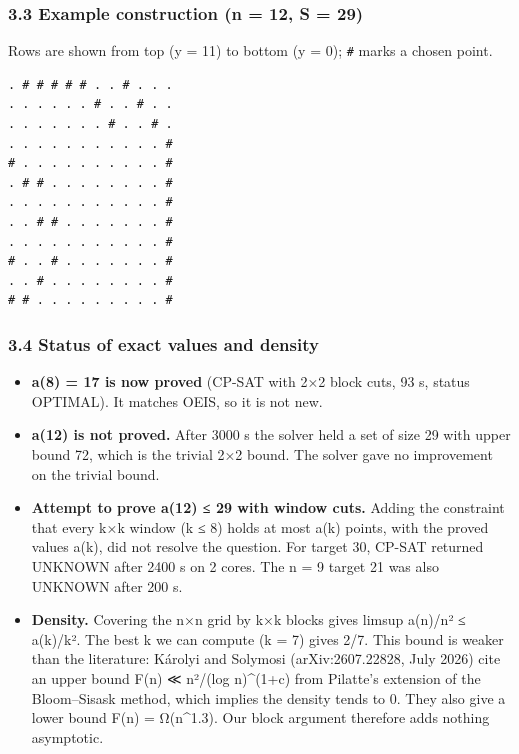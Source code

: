 \documentclass[
  11pt,
]{article}
\providecommand{\tightlist}{%
  \setlength{\itemsep}{0pt}\setlength{\parskip}{0pt}}
\begin{document}
\subsubsection{3.3 Example construction (n = 12, \textbar S\textbar{} =
29)}\label{example-construction-n-12-s-29}

Rows are shown from top (y = 11) to bottom (y = 0); \texttt{\#} marks a
chosen point.

\begin{verbatim}
. # # # # # . . # . . .
. . . . . . # . . # . .
. . . . . . . # . . # .
. . . . . . . . . . . #
# . . . . . . . . . . #
. # # . . . . . . . . #
. . . . . . . . . . . #
. . # # . . . . . . . #
. . . . . . . . . . . #
# . . # . . . . . . . #
. . # . . . . . . . . #
# # . . . . . . . . . #
\end{verbatim}

\subsubsection{3.4 Status of exact values and
density}\label{status-of-exact-values-and-density}

\begin{itemize}
\tightlist
\item
  \textbf{a(8) = 17 is now proved} (CP-SAT with 2×2 block cuts, 93 s,
  status OPTIMAL). It matches OEIS, so it is not new.
\item
  \textbf{a(12) is not proved.} After 3000 s the solver held a set of
  size 29 with upper bound 72, which is the trivial 2×2 bound. The
  solver gave no improvement on the trivial bound.
\item
  \textbf{Attempt to prove a(12) ≤ 29 with window cuts.} Adding the
  constraint that every k×k window (k ≤ 8) holds at most a(k) points,
  with the proved values a(k), did not resolve the question. For target
  30, CP-SAT returned UNKNOWN after 2400 s on 2 cores. The n = 9 target
  21 was also UNKNOWN after 200 s.
\item
  \textbf{Density.} Covering the n×n grid by k×k blocks gives limsup
  a(n)/n² ≤ a(k)/k². The best k we can compute (k = 7) gives 2/7. This
  bound is weaker than the literature: Károlyi and Solymosi
  (arXiv:2607.22828, July 2026) cite an upper bound F(n) ≪ n²/(log
  n)\^{}(1+c) from Pilatte's extension of the Bloom--Sisask method,
  which implies the density tends to 0. They also give a lower bound
  F(n) = Ω(n\^{}1.3). Our block argument therefore adds nothing
  asymptotic.
\end{itemize}
\end{document}
